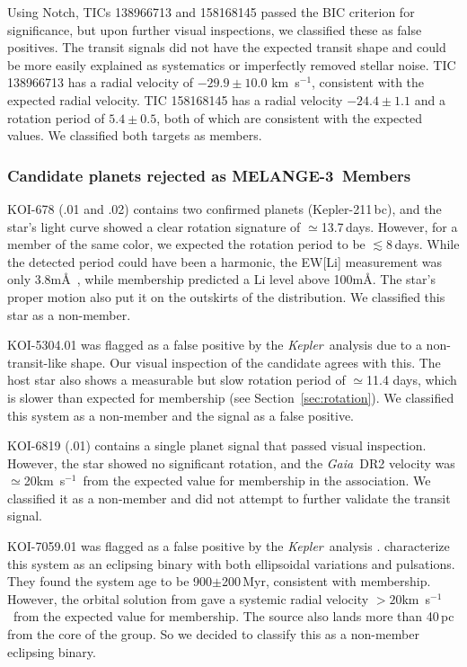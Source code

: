 \documentclass[twocolumn, linenumbers]{aastex631}
\newcommand{\association}{MELANGE-3}
\newcommand{\kepler}{{\it Kepler}}
\newcommand\kms{km~s$^{-1}$}
\newcommand{\gaia}{\textit{Gaia}}
\begin{document}
Using Notch, TICs 138966713 and 158168145 passed the BIC criterion for significance, but upon further visual inspections, we classified these as false positives. The transit signals did not have the expected transit shape and could be more easily explained as systematics or imperfectly removed stellar noise. TIC 138966713 has a radial velocity of $-29.9 \pm 10.0$ \kms, consistent with the expected radial velocity. TIC 158168145 has a radial velocity $-24.4 \pm 1.1$ and a rotation period of $5.4 \pm 0.5$, both of which are consistent with the expected values. We classified both targets as members. 

\subsubsection{Candidate planets rejected as \association\ Members}\label{sec:rejectedMems}

KOI-678 (.01 and .02) contains two confirmed planets (Kepler-211\,bc), and the star's light curve showed a clear rotation signature of $\simeq$13.7\,days. However, for a member of the same color, we expected the rotation period to be $\lesssim$8\,days. While the detected period could have been a harmonic, the EW[Li] measurement was only 3.8m\AA\ \citep{2018ApJ...855..115B}, while membership predicted a Li level above 100m\AA. The star's proper motion also put it on the outskirts of the distribution. We classified this star as a non-member. 

KOI-5304.01 was flagged as a false positive by the \kepler\ analysis due to a non-transit-like shape. Our visual inspection of the candidate agrees with this. The host star also shows a measurable but slow rotation period of $\simeq$11.4 days, which is slower than expected for membership (see Section~\ref{sec:rotation}). We classified this system as a non-member and the signal as a false positive.

KOI-6819 (.01) contains a single planet signal that passed visual inspection. However, the star showed no significant rotation, and the \gaia\ DR2 velocity was $\simeq$20\kms\ from the expected value for membership in the association. We classified it as a non-member and did not attempt to further validate the transit signal.

KOI-7059.01 was flagged as a false positive by the \kepler\ analysis \citep{2016ApJS..224...12C}. \citet{2014MNRAS.443.3068B} characterize this system as an eclipsing binary with both ellipsoidal variations and pulsations. They found the system age to be 900$\pm$200\,Myr, consistent with membership. However, the orbital solution from \citet{2014MNRAS.443.3068B} gave a systemic radial velocity $>20$\kms\ from the expected value for membership. The source also lands more than 40\,pc from the core of the group. So we decided to classify this as a non-member eclipsing binary. 
\end{document}
